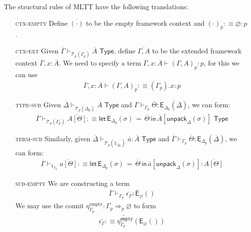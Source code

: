 \documentclass[10pt]{article}
\theoremstyle{definition}
\let\emptyset\varnothing
\newcommand{\yields}{\vdash}
\newcommand{\tcell}{\Rightarrow}
\newcommand{\TYPE}{\,\,\mathsf{Type}}
\newcommand{\rewrite}[2]{\overleftarrow{#1}(#2)}
\newcommand\E[2]{\ensuremath{\mathsf{E}_{#1}(#2)}}
\newcommand\EEs[4]{\ensuremath{\mathsf{let} \, \mathsf{E}_{#1}(#3) \, = \, {#2} \, \mathsf{in} \, #4}}
\newcommand\EIs[2]{\ensuremath{\mathsf{E}_{#1}{(#2)}}}
\newcommand\El[2]{\mathcal{T}_{#1}(#2)}
\newcommand\unpack[2]{\ensuremath{\mathsf{unpack}_{#1}(#2)}}
\newcommand{\modeof}[1]{{#1}_p}
\newcommand{\tempty}{\ensuremath{\mathtt{empty}}}
\newcommand{\sempty}{\ensuremath{\mathrm{empty}}}
\newcommand{\upstairs}[1]{\overline{#1}}
\newcommand\One{\ensuremath{\mathds{1}}}
\begin{document}
The structural rules of MLTT have the following translations:
\begin{enumerate}
\item[\textsc{ctx-empty}] Define $\upstairs{(\cdot)}$ to be the empty framework context and $\modeof{(\cdot)} :\equiv \emptyset : p$.

\item[\textsc{ctx-ext}] Given $\upstairs{\Gamma}
  \yields_{\El{p}{\modeof{\Gamma}}} \upstairs{A} \TYPE$, define $\upstairs{\Gamma, A}$ to be the extended framework context $\upstairs{\Gamma}, x : \upstairs{A}$. We need to specify a term $\upstairs{\Gamma}, x : \upstairs{A} \yields \modeof{(\Gamma, A)} : p$, for this we can use
  \begin{align*}
  \upstairs{\Gamma}, x : \upstairs{A} \yields \modeof{(\Gamma, A)} :\equiv (\modeof{\Gamma}).x : p
  \end{align*}
  
\item[\textsc{type-sub}] Given $\upstairs{\Delta} \yields_{\El{p}{\modeof{\Delta}}} \upstairs{A} \TYPE$ and $\upstairs{\Gamma} \yields_{\modeof{\Gamma}} \upstairs{\Theta} : \E{\modeof{\Delta}}{\upstairs{\Delta}}$, we can form:
\begin{align*}
\upstairs{\Gamma} \yields_{\El{p}{\modeof{\Gamma}}} \upstairs{A[\Theta]} :\equiv \EEs{\modeof{\Delta}}{\upstairs{\Theta}}{\sigma}{\upstairs{A}[\unpack{\Delta}{\sigma}]} \TYPE
\end{align*}

\item[\textsc{term-sub}] Similarly, given $\upstairs{\Delta} \yields_{\El{p}{\One_{\modeof{\Delta}}}} \upstairs{a} : \upstairs{A} \TYPE$ and $\upstairs{\Gamma} \yields_{\modeof{\Gamma}} \upstairs{\Theta} : \E{\modeof{\Delta}}{\upstairs{\Delta}}$, we can form:
\begin{align*}
\upstairs{\Gamma} \yields_{\One_{\modeof{\Gamma}}} \upstairs{a[\Theta]} :\equiv \EEs{\modeof{\Delta}}{\upstairs{\Theta}}{\sigma}{\upstairs{a}[\unpack{\Delta}{\sigma}]} : \upstairs{A[\Theta]}
\end{align*}

\item[\textsc{sub-empty}] We are constructing a term
\begin{align*}
\upstairs{\Gamma} \yields_{\modeof{\Gamma}} \upstairs{\epsilon_\Gamma} : \E{\emptyset}{}
\end{align*}
We may use the counit $\eta^\sempty_{\modeof{\Gamma}} : \modeof{\Gamma} \tcell_p \emptyset$ to form
\begin{align*}
\upstairs{\epsilon_\Gamma} :\equiv \rewrite{\eta^\tempty_{\modeof{\Gamma}}}{\EIs{\emptyset}{}}
\end{align*}


\end{enumerate}
\end{document}
